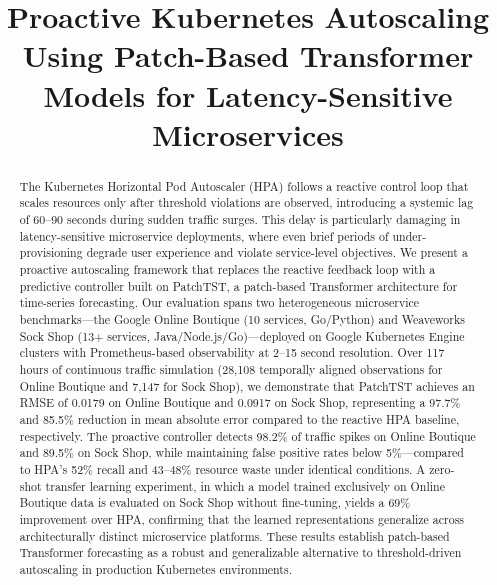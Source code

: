 \documentclass[conference]{IEEEtran}
\begin{document}
\title{Proactive Kubernetes Autoscaling Using Patch-Based Transformer Models for Latency-Sensitive Microservices}

\author{
}

\maketitle

\begin{abstract}
The Kubernetes Horizontal Pod Autoscaler (HPA) follows a reactive control loop that scales resources only after threshold violations are observed, introducing a systemic lag of 60--90 seconds during sudden traffic surges. This delay is particularly damaging in latency-sensitive microservice deployments, where even brief periods of under-provisioning degrade user experience and violate service-level objectives. We present a proactive autoscaling framework that replaces the reactive feedback loop with a predictive controller built on PatchTST, a patch-based Transformer architecture for time-series forecasting. Our evaluation spans two heterogeneous microservice benchmarks---the Google Online Boutique (10 services, Go/Python) and Weaveworks Sock Shop (13+ services, Java/Node.js/Go)---deployed on Google Kubernetes Engine clusters with Prometheus-based observability at 2--15 second resolution. Over 117 hours of continuous traffic simulation (28,108 temporally aligned observations for Online Boutique and 7,147 for Sock Shop), we demonstrate that PatchTST achieves an RMSE of 0.0179 on Online Boutique and 0.0917 on Sock Shop, representing a 97.7\% and 85.5\% reduction in mean absolute error compared to the reactive HPA baseline, respectively. The proactive controller detects 98.2\% of traffic spikes on Online Boutique and 89.5\% on Sock Shop, while maintaining false positive rates below 5\%---compared to HPA's 52\% recall and 43--48\% resource waste under identical conditions. A zero-shot transfer learning experiment, in which a model trained exclusively on Online Boutique data is evaluated on Sock Shop without fine-tuning, yields a 69\% improvement over HPA, confirming that the learned representations generalize across architecturally distinct microservice platforms. These results establish patch-based Transformer forecasting as a robust and generalizable alternative to threshold-driven autoscaling in production Kubernetes environments.
\end{abstract}
\end{document}
